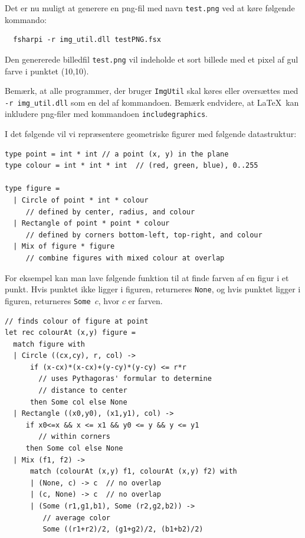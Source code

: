 \documentclass[a4paper,12pt]{article}
\begin{document}
\begin{enumerate}[label=8ø.\arabic*,start=0]
\noindent
Det er nu muligt at generere en png-fil med navn \texttt{test.png} ved
at køre følgende kommando:

\vspace{-4mm}
\begin{verbatim}
  fsharpi -r img_util.dll testPNG.fsx
\end{verbatim}
\vspace{-4mm}

\noindent
Den genererede billedfil \texttt{test.png} vil indeholde
et sort billede med et pixel af gul farve i punktet (10,10).

\noindent
Bemærk, at alle programmer, der bruger \texttt{ImgUtil} skal køres
eller oversættes med \texttt{-r img\_util.dll} som en del af
kommandoen.
%
Bemærk endvidere, at \LaTeX\ kan inkludere png-filer med
kommandoen \texttt{includegraphics}.

\vspace{2ex}

\noindent
I det følgende vil vi repræsentere geometriske figurer med følgende
datastruktur:

\begin{lstlisting}[numbers=none,frame=none,mathescape]
type point = int * int // a point (x, y) in the plane
type colour = int * int * int  // (red, green, blue), 0..255

type figure =
  | Circle of point * int * colour
     // defined by center, radius, and colour
  | Rectangle of point * point * colour
     // defined by corners bottom-left, top-right, and colour
  | Mix of figure * figure
     // combine figures with mixed colour at overlap
\end{lstlisting}

\noindent
For eksempel kan man lave følgende funktion til at finde farven af en
figur i et punkt.  Hvis punktet ikke ligger i figuren, returneres
\texttt{None}, og hvis punktet ligger i figuren, returneres
\texttt{Some $c$}, hvor $c$ er farven.

\begin{lstlisting}[numbers=none,frame=none,mathescape]
// finds colour of figure at point
let rec colourAt (x,y) figure =
  match figure with
  | Circle ((cx,cy), r, col) ->
      if (x-cx)*(x-cx)+(y-cy)*(y-cy) <= r*r
        // uses Pythagoras' formular to determine
        // distance to center
      then Some col else None
  | Rectangle ((x0,y0), (x1,y1), col) ->
     if x0<=x && x <= x1 && y0 <= y && y <= y1
        // within corners
     then Some col else None
  | Mix (f1, f2) ->
      match (colourAt (x,y) f1, colourAt (x,y) f2) with
      | (None, c) -> c  // no overlap
      | (c, None) -> c  // no overlap
      | (Some (r1,g1,b1), Some (r2,g2,b2)) ->
         // average color
         Some ((r1+r2)/2, (g1+g2)/2, (b1+b2)/2)
\end{lstlisting}


\end{enumerate}
\end{document}
